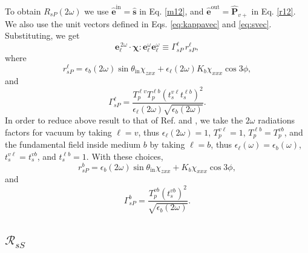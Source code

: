 \documentclass[10pt]{book}
\begin{document}
To obtain $R_{sP}(2\omega)$ we use
$\hat{\mathbf{e}}^{\mathrm{in}}=\hat{\mathbf{s}}$ in Eq. \eqref{m12}, and
$\hat{\mathbf{e}}^{\mathrm{out}}=\hat{\mathbf{P}}_{v+}$ in Eq. \eqref{r12}. We
also use the unit vectors defined in Eqs. \eqref{eq:kappavec} and
\eqref{eq:svec}. Substituting, we get
\begin{equation*}
\mathbf{e}^{\,2\omega}_{\ell}\cdot
\boldsymbol{\chi}:\mathbf{e}^\omega_{\ell}\mathbf{e}^\omega_{\ell}
\equiv\Gamma^{\ell}_{sP}\, r^{\ell}_{sP},
\end{equation*}
where
\begin{equation}
r^{\ell}_{sP}
= \epsilon_{b}(2\omega)\sin\theta_{\mathrm{in}}\chi_{zxx}
+ \epsilon_{\ell}(2\omega)K_{b}\chi_{xxx}\cos3\phi,
\end{equation} 
and  
\begin{equation}
\Gamma^{\ell}_{sP}=
\frac{T_{p}^{\ell v}T^{\ell b}_{p}\left(t_s^{v\ell}t^{\ell b}_s\right)^2}
     {\epsilon_{\ell}(2\omega)\sqrt{\epsilon_{b}(2\omega)}}.  
\end{equation} 
In order to reduce above result to that of Ref. \cite{mizrahiJOSA88} and
\cite{sipePRB87}, we take the $2\omega$ radiations factors for vacuum by
taking $\ell=v$, thus $\epsilon_{\ell}(2\omega)=1$, $T^{v\ell}_{p}=1$,
$T^{\ell b}_{p}=T^{vb}_{p}$, and the fundamental field inside medium $b$ by
taking $\ell=b$, thus $\epsilon_{\ell}(\omega)=\epsilon_{b}(\omega)$,
$t^{v\ell}_s=t^{vb}_s$, and $t^{\ell b}_s=1$. With these choices,
\begin{equation*}
r^{b}_{sP} = \epsilon_{b}(2\omega)\sin\theta_{\mathrm{in}}\chi_{zxx}
+ K_{b}\chi_{xxx}\cos3\phi,
\end{equation*} 
and 
\begin{equation*}
\Gamma^{b}_{sP} =
\frac{T^{v b}_{p}(t_s^{vb})^{2}}{\sqrt{\epsilon_{b}(2\omega)}}.  
\end{equation*}


\subsection{\texorpdfstring{$\mathcal{R}_{sS}$}{RsS}}
\end{document}
